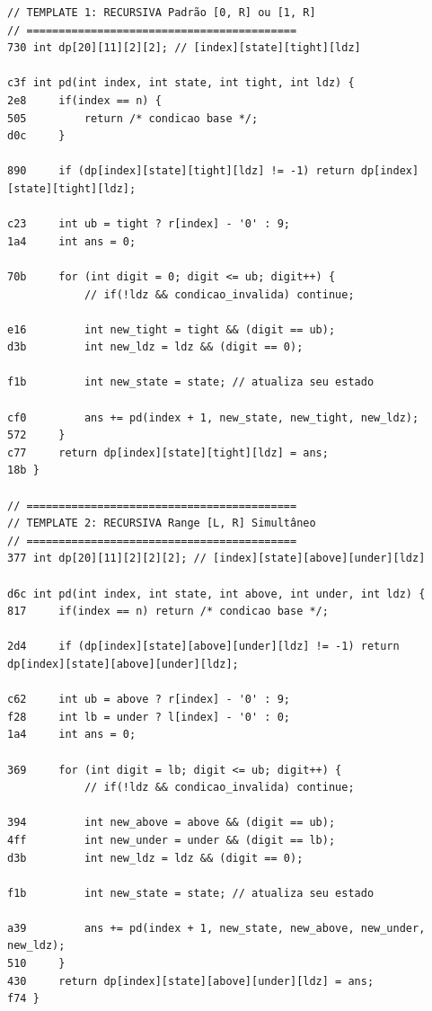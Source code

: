 \documentclass[11pt, a4paper, twoside]{article}
\begin{document}
\begin{lstlisting}
// TEMPLATE 1: RECURSIVA Padrão [0, R] ou [1, R]
// ==========================================
730 int dp[20][11][2][2]; // [index][state][tight][ldz]

c3f int pd(int index, int state, int tight, int ldz) {
2e8     if(index == n) {
505         return /* condicao base */;
d0c     }
        
890     if (dp[index][state][tight][ldz] != -1) return dp[index][state][tight][ldz];
    
c23     int ub = tight ? r[index] - '0' : 9;
1a4     int ans = 0;
    
70b     for (int digit = 0; digit <= ub; digit++) {
            // if(!ldz && condicao_invalida) continue;
    
e16         int new_tight = tight && (digit == ub);
d3b         int new_ldz = ldz && (digit == 0);
            
f1b         int new_state = state; // atualiza seu estado
    
cf0         ans += pd(index + 1, new_state, new_tight, new_ldz);
572     }
c77     return dp[index][state][tight][ldz] = ans; 
18b }

// ==========================================
// TEMPLATE 2: RECURSIVA Range [L, R] Simultâneo
// ==========================================
377 int dp[20][11][2][2][2]; // [index][state][above][under][ldz]

d6c int pd(int index, int state, int above, int under, int ldz) {
817     if(index == n) return /* condicao base */;
    
2d4     if (dp[index][state][above][under][ldz] != -1) return dp[index][state][above][under][ldz];
    
c62     int ub = above ? r[index] - '0' : 9;
f28     int lb = under ? l[index] - '0' : 0;
1a4     int ans = 0;
    
369     for (int digit = lb; digit <= ub; digit++) {
            // if(!ldz && condicao_invalida) continue;
    
394         int new_above = above && (digit == ub);
4ff         int new_under = under && (digit == lb);
d3b         int new_ldz = ldz && (digit == 0);
            
f1b         int new_state = state; // atualiza seu estado
    
a39         ans += pd(index + 1, new_state, new_above, new_under, new_ldz);
510     }
430     return dp[index][state][above][under][ldz] = ans; 
f74 }


\end{lstlisting}
\end{document}
